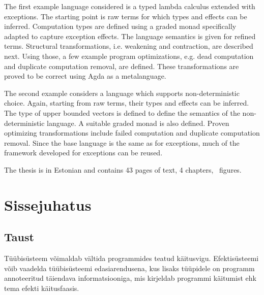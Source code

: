\documentclass[a4paper,12pt]{article}
\begin{document}
The first example language considered is a typed lambda calculus extended with exceptions.
The starting point is raw terms for which types and effects can be inferred.
Computation types are defined using a graded monad specifically adapted to capture exception effects.
The language semantics is given for refined terms.
Structural transformations, i.e. weakening and contraction, are described next.
Using those, a few example program optimizations, e.g. dead computation and duplicate computation removal, are defined.
These transformations are proved to be correct using Agda as a metalanguage.

The second example considers a language which supports non-deterministic choice.
Again, starting from raw terms, their types and effects can be inferred.
The type of upper bounded vectors is defined to define the semantics of the non-deterministic language.
A suitable graded monad is also defined.
Proven optimizing transformations include failed computation and duplicate computation removal.
Since the base language is the same as for exceptions, much of the framework developed for exceptions can be reused.

The thesis is in Estonian and contains 43 pages of text, 4 chapters, \totalfigures~figures.
\clearpage\vspace*{0pt}

\vspace*{60pt}
\begingroup
{}
\def\addvspace#1{}
\tableofcontents
\endgroup

\clearpage\vspace*{0pt}

\listoffigures

\clearpage\vspace*{0pt}

\section{Sissejuhatus}

\subsection{Taust}
Tüübisüsteem võimaldab vältida programmides teatud käitusvigu.
Efektisüsteemi võib vaadelda tüübisüsteemi edasiarendusena, kus lisaks tüüpidele on programm annoteeritud täiendava informatsiooniga, mis kirjeldab programmi käitumist ehk tema efekti käitusfaasis.
\end{document}
